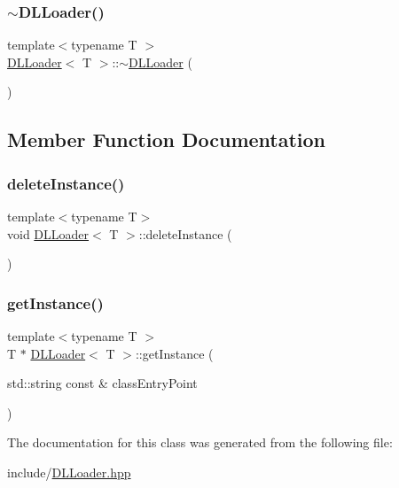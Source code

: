 \subsubsection{\texorpdfstring{$\sim$\+D\+L\+Loader()}{~DLLoader()}}
{\footnotesize\ttfamily template$<$typename T $>$ \\
\hyperlink{class_d_l_loader}{D\+L\+Loader}$<$ T $>$\+::$\sim$\hyperlink{class_d_l_loader}{D\+L\+Loader} (\begin{DoxyParamCaption}{ }\end{DoxyParamCaption})\hspace{0.3cm}{\ttfamily [virtual]}}



\subsection{Member Function Documentation}
\mbox{\label{class_d_l_loader_acdd8ffa8f550ca1abe29bc1b24dc9914}} 
\subsubsection{\texorpdfstring{delete\+Instance()}{deleteInstance()}}
{\footnotesize\ttfamily template$<$typename T$>$ \\
void \hyperlink{class_d_l_loader}{D\+L\+Loader}$<$ T $>$\+::delete\+Instance (\begin{DoxyParamCaption}{ }\end{DoxyParamCaption})}

\mbox{\label{class_d_l_loader_a27e0859099bf3bc981ee615078bc1c2f}} 
\subsubsection{\texorpdfstring{get\+Instance()}{getInstance()}}
{\footnotesize\ttfamily template$<$typename T $>$ \\
T $\ast$ \hyperlink{class_d_l_loader}{D\+L\+Loader}$<$ T $>$\+::get\+Instance (\begin{DoxyParamCaption}\item[{std\+::string const \&}]{class\+Entry\+Point }\end{DoxyParamCaption})}



The documentation for this class was generated from the following file\+:\begin{DoxyCompactItemize}
\item 
include/\hyperlink{_d_l_loader_8hpp}{D\+L\+Loader.\+hpp}\end{DoxyCompactItemize}

